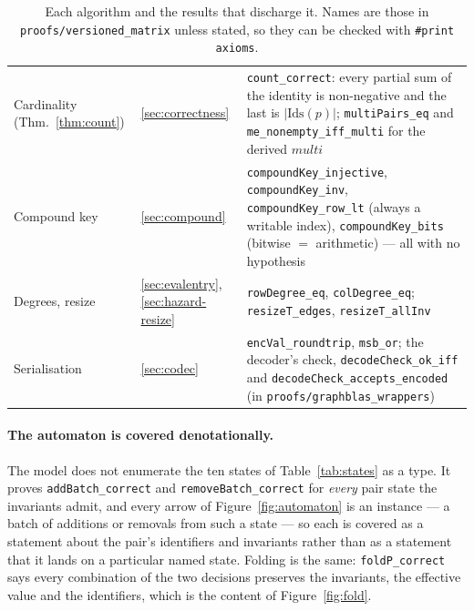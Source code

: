 \documentclass[11pt,a4paper]{article}
\theoremstyle{plain}
\theoremstyle{definition}
\theoremstyle{remark}
\begin{document}
\begin{table}[t]
\begin{tabular}{@{}llp{7.2cm}@{}}
\midrule
Cardinality (Thm.~\ref{thm:count}) & \ref{sec:correctness}
                                   & \texttt{count\_correct}: every partial sum of the identity is
                                     non-negative and the last is $|\mathrm{Ids}(p)|$;
                                     \texttt{multiPairs\_eq} and \texttt{me\_nonempty\_iff\_multi}
                                     for the derived $\textit{multi}$ \\
Compound key      & \ref{sec:compound}& \texttt{compoundKey\_injective},
                                       \texttt{compoundKey\_inv}, \texttt{compoundKey\_row\_lt}
                                       (always a writable index), \texttt{compoundKey\_bits}
                                       (bitwise $=$ arithmetic) --- all with no hypothesis \\
Degrees, resize   & \ref{sec:evalentry}, \ref{sec:hazard-resize}
                                     & \texttt{rowDegree\_eq}, \texttt{colDegree\_eq};
                                       \texttt{resizeT\_edges}, \texttt{resizeT\_allInv} \\
Serialisation     & \ref{sec:codec}  & \texttt{encVal\_roundtrip}, \texttt{msb\_or}; the decoder's
                                       check, \texttt{decodeCheck\_ok\_iff} and
                                       \texttt{decodeCheck\_accepts\_encoded}
                                       (in \texttt{proofs/graphblas\_wrappers}) \\
\bottomrule
\end{tabular}
\caption{Each algorithm and the results that discharge it. Names are those in
\texttt{proofs/versioned\_matrix} unless stated, so they can be checked with
\texttt{\#print axioms}.}
\label{tab:mechanised}
\end{table}

\paragraph{The automaton is covered denotationally.} The model does not
enumerate the ten states of Table~\ref{tab:states} as a type. It proves
\texttt{addBatch\_correct} and \texttt{removeBatch\_correct} for \emph{every}
pair state the invariants admit, and every arrow of
Figure~\ref{fig:automaton} is an instance --- a batch of additions or removals
from such a state --- so each is covered as a statement about the pair's
identifiers and invariants rather than as a statement that it lands on a
particular named state. Folding is the same: \texttt{foldP\_correct} says every
combination of the two decisions preserves the invariants, the effective value
and the identifiers, which is the content of Figure~\ref{fig:fold}.
\end{document}
